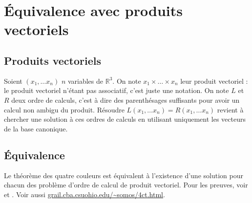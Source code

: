 \section{Équivalence avec produits vectoriels}
\subsection{Produits vectoriels}
Soient $(x_1, \ldots x_n)$ $n$ variables de $\mathbb{R}^3$. On note
$x_1 \times \ldots \times x_n$ leur produit vectoriel : le produit vectoriel
n'étant pas associatif, c'est juste une notation. On note $L$ et $R$ deux ordre
de calculs, c'est à dire des parenthésages suffisants pour avoir un calcul non
ambigu du produit. Résoudre $L(x_1, \ldots x_n) = R(x_1, \ldots x_n)$ revient à
chercher une solution à ces ordres de calculs en utilisant uniquement les
vecteurs de la base canonique.

\subsection{Équivalence}
Le théorème des quatre couleurs est équivalent à l'existence d'une solution
pour chacun des problème d'ordre de calcul de produit vectoriel. Pour les
preuves, voir \cite{osorio09} et \cite{4col}. Voir aussi \url{grail.cba.csuohio.edu/~somos/4ct.html}.

